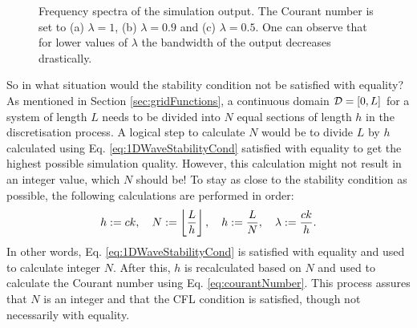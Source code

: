 \begin{figure}[t]
    \caption{Frequency spectra of the simulation output. The Courant number is set to (a) $\lambda = 1$, (b) $\lambda = 0.9$ and (c) $\lambda = 0.5$. One can observe that for lower values of $
    \lambda$ the bandwidth of the output decreases drastically. \label{fig:1DWaveBandwidth}}
\end{figure}

So in what situation would the stability condition not be satisfied with equality? As mentioned in Section \ref{sec:gridFunctions}, a continuous domain $\mathcal{D} = [0,L]$ for a system of length $L$ needs to be divided into $N$ equal sections of length $h$ in the discretisation process. A logical step to calculate $N$ would be to divide $L$ by $h$ calculated using Eq. \eqref{eq:1DWaveStabilityCond} satisfied with equality to get the highest possible simulation quality. However, this calculation might not result in an integer value, which $N$ should be! To stay as close to the stability condition as possible, the following calculations are performed in order:
\begin{equation}\label{eq:orderOfCalc}
    h := ck, \quad N := \floor[\frac{L}{h}], \quad h := \frac{L}{N}, \quad \lambda := \frac{ck}{h}.
\end{equation}
In other words, Eq. \eqref{eq:1DWaveStabilityCond} is satisfied with equality and used to calculate integer $N$. After this, $h$ is recalculated based on $N$ and used to calculate the Courant number using Eq. \eqref{eq:courantNumber}. This process assures that $N$ is an integer and that the CFL condition is satisfied, though not necessarily with equality.

